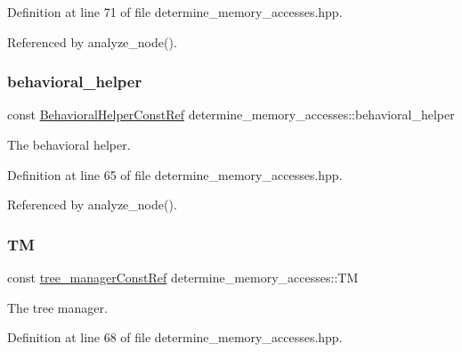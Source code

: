 Definition at line 71 of file determine\+\_\+memory\+\_\+accesses.\+hpp.



Referenced by analyze\+\_\+node().

\mbox{\label{classdetermine__memory__accesses_ab1b211e2e30260df1c147d7c3fe30240}} 
\subsubsection{\texorpdfstring{behavioral\+\_\+helper}{behavioral\_helper}}
{\footnotesize\ttfamily const \hyperlink{behavioral__helper_8hpp_aae973b54cac87eef3b27442aa3e1e425}{Behavioral\+Helper\+Const\+Ref} determine\+\_\+memory\+\_\+accesses\+::behavioral\+\_\+helper\hspace{0.3cm}{\ttfamily [private]}}



The behavioral helper. 



Definition at line 65 of file determine\+\_\+memory\+\_\+accesses.\+hpp.



Referenced by analyze\+\_\+node().

\mbox{\label{classdetermine__memory__accesses_a6dc11035d8da329f4f6e8008e1f36e06}} 
\subsubsection{\texorpdfstring{TM}{TM}}
{\footnotesize\ttfamily const \hyperlink{tree__manager_8hpp_a792e3f1f892d7d997a8d8a4a12e39346}{tree\+\_\+manager\+Const\+Ref} determine\+\_\+memory\+\_\+accesses\+::\+TM\hspace{0.3cm}{\ttfamily [private]}}



The tree manager. 



Definition at line 68 of file determine\+\_\+memory\+\_\+accesses.\+hpp.



